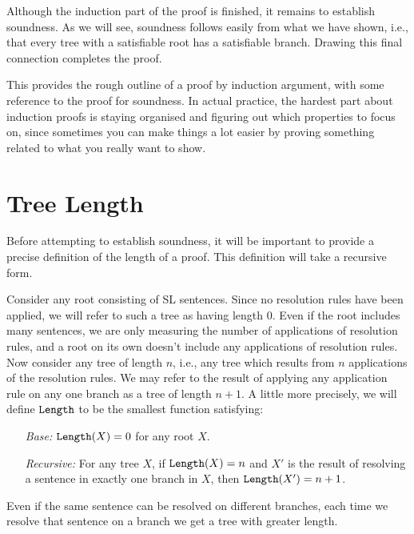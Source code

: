 Although the induction part of the proof is finished, it remains to establish soundness.
As we will see, soundness follows easily from what we have shown, i.e., that every tree with a satisfiable root has a satisfiable branch.
Drawing this final connection completes the proof.

This provides the rough outline of a proof by induction argument, with some reference to the proof for soundness.
In actual practice, the hardest part about induction proofs is staying organised and figuring out which properties to focus on, since sometimes you can make things a lot easier by proving something related to what you really want to show.





\section{Tree Length}

Before attempting to establish soundness, it will be important to provide a precise definition of the length of a proof.
This definition will take a recursive form.

Consider any root consisting of SL sentences.
Since no resolution rules have been applied, we will refer to such a tree as having length 0.
Even if the root includes many sentences, we are only measuring the number of applications of resolution rules, and a root on its own doesn't include any applications of resolution rules.
Now consider any tree of length $n$, i.e., any tree which results from $n$ applications of the resolution rules. 
We may refer to the result of applying any application rule on any one branch as a tree of length $n+1$.
A little more precisely, we will define $\texttt{Length}$ to be the smallest function satisfying:%
\begin{enumerate}[leftmargin=1in,labelsep=.15in]
  \item[\it Base:] $\texttt{Length}(X)=0$ for any root $X$.
  \item[\it Recursive:] For any tree $X$, if $\texttt{Length}(X)=n$ and $X'$ is the result of resolving a sentence in exactly one branch in $X$, then $\texttt{Length}(X')=n+1$.
\end{enumerate}
Even if the same sentence can be resolved on different branches, each time we resolve that sentence on a branch we get a tree with greater length.




